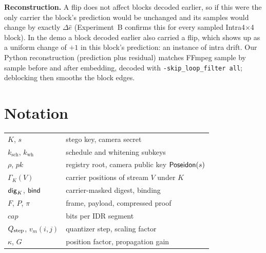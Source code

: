 \textbf{Reconstruction.} A flip does not affect blocks decoded earlier, so if this were the only carrier the block's prediction would be unchanged and its samples would change by exactly $\Delta\hat e$ (Experiment~B confirms this for every sampled Intra4$\times$4 block). In the demo a block decoded earlier also carried a flip, which shows up as a uniform change of $+1$ in this block's prediction: an instance of intra drift. Our Python reconstruction (prediction plus residual) matches FFmpeg sample by sample before and after embedding, decoded with \texttt{-skip\_loop\_filter all}; deblocking then smooths the block edges.

\section{Notation}
\begin{table}[h]
\centering
\small
\begin{tabular}{@{}ll@{}}
\toprule
$K$, $s$ & stego key, camera secret \\
$k_{\mathrm{sch}}$, $k_{\mathrm{wh}}$ & schedule and whitening subkeys \\
$\rho$, $pk$ & registry root, camera public key $\mathsf{Poseidon}(s)$ \\
$\Gamma_K(V)$ & carrier positions of stream $V$ under $K$ \\
$\mathsf{dig}_K$, $\mathsf{bind}$ & carrier-masked digest, binding \\
$F$, $P$, $\pi$ & frame, payload, compressed proof \\
$\mathit{cap}$ & bits per IDR segment \\
$Q_{\mathrm{step}}$, $v_m(i,j)$ & quantizer step, scaling factor \\
$\kappa$, $G$ & position factor, propagation gain \\
\bottomrule
\end{tabular}
\end{table}
